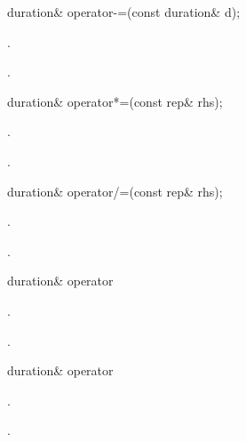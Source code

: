 %
%
\begin{itemdecl}
duration& operator-=(const duration& d);
\end{itemdecl}

\begin{itemdescr}
\pnum
\effects {}.

\pnum
\returns {}.
\end{itemdescr}

%
%
\begin{itemdecl}
duration& operator*=(const rep& rhs);
\end{itemdecl}

\begin{itemdescr}
\pnum
\effects {}.

\pnum
\returns {}.
\end{itemdescr}

%
%
\begin{itemdecl}
duration& operator/=(const rep& rhs);
\end{itemdecl}

\begin{itemdescr}
\pnum
\effects {}.

\pnum
\returns {}.
\end{itemdescr}

%
%
\begin{itemdecl}
duration& operator%
\end{itemdecl}

\begin{itemdescr}
\pnum
\effects {}.

\pnum
\returns {}.
\end{itemdescr}

%
%
\begin{itemdecl}
duration& operator%
\end{itemdecl}

\begin{itemdescr}
\pnum
\effects {}.

\pnum
\returns {}.
\end{itemdescr}


